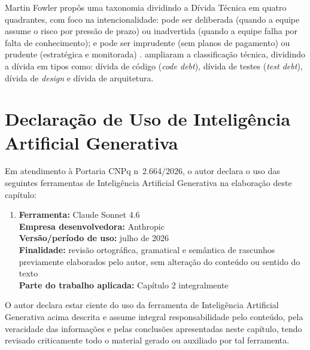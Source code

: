 Martin Fowler propôs uma taxonomia dividindo a Dívida Técnica em quatro quadrantes, com foco na intencionalidade: pode ser deliberada (quando a equipe assume o risco por pressão de prazo) ou inadvertida (quando a equipe falha por falta de conhecimento); e pode ser imprudente (sem planos de pagamento) ou prudente (estratégica e monitorada) \cite{fowler2019technicaldebt}.  ampliaram a classificação técnica, dividindo a dívida em tipos como: dívida de código (\textit{code debt}), dívida de testes (\textit{test debt}), dívida de \textit{design} e dívida de arquitetura.

\section{Declaração de Uso de Inteligência Artificial Generativa}

Em atendimento à Portaria CNPq n\textordmasculine\ 2.664/2026, o autor declara o uso das seguintes ferramentas de Inteligência Artificial Generativa na elaboração deste capítulo:

\begin{enumerate}
    \item \textbf{Ferramenta:} Claude Sonnet 4.6 \\
    \textbf{Empresa desenvolvedora:} Anthropic \\
    \textbf{Versão/período de uso:} julho de 2026 \\
    \textbf{Finalidade:} revisão ortográfica, gramatical e semântica de rascunhos previamente elaborados pelo autor, sem alteração do conteúdo ou sentido do texto \\
    \textbf{Parte do trabalho aplicada:} Capítulo 2 integralmente
\end{enumerate}

O autor declara estar ciente do uso da ferramenta de Inteligência Artificial Generativa acima descrita e assume integral responsabilidade pelo conteúdo, pela veracidade das informações e pelas conclusões apresentadas neste capítulo, tendo revisado criticamente todo o material gerado ou auxiliado por tal ferramenta.
